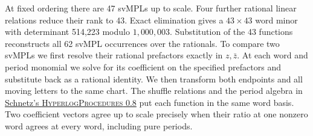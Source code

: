 At fixed ordering there are 47 svMPLs up to scale. Four further rational
linear relations reduce their rank to 43. Exact elimination gives a \(43\times43\) word minor
with determinant 514{,}223 modulo \(1{,}000{,}003\). Substitution of the
43 functions reconstructs all 62 svMPL occurrences over the rationals.
To compare two svMPLs we first resolve their rational prefactors exactly in
\(z,\bar z\). At each word and period monomial we solve for its coefficient on
the specified prefactors and substitute back as a rational identity.
We then transform both endpoints and all moving letters to the same chart.
The shuffle relations and the period algebra in
\href{https://github.com/oliverschnetz/HyperlogProcedures}{Schnetz's
\textsc{HyperlogProcedures} 0.8} put each function in the same word basis.
Two coefficient vectors agree up to scale precisely when their ratio at one
nonzero word agrees at every word, including pure periods.
\clearpage

